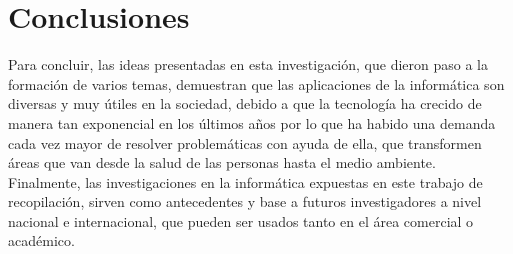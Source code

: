 \documentclass[10pt,journal]{IEEEtran}
\begin{document}
    
    \section{\textbf{Conclusiones}}
    Para concluir, las ideas presentadas en esta investigación, que dieron paso a la formación de varios temas, demuestran que las aplicaciones de la informática son diversas y muy útiles en la sociedad, debido a que la tecnología ha crecido de manera tan exponencial en los últimos años por lo que ha habido una demanda cada vez mayor de resolver problemáticas con ayuda de ella, que transformen áreas que van desde la salud de las personas hasta el medio ambiente. Finalmente, las investigaciones en la informática expuestas en este trabajo de recopilación, sirven como antecedentes y base a futuros investigadores a nivel nacional e internacional, que pueden ser usados tanto en el área comercial o académico.
\medskip

\end{document}
